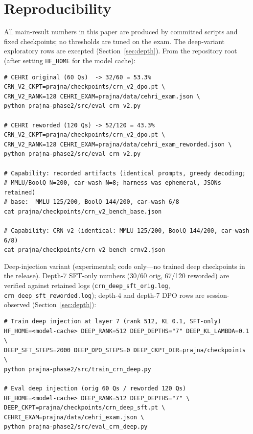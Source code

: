 \documentclass[11pt]{article}
\begin{document}
\section*{Reproducibility}

All main-result numbers in this paper are produced by committed scripts and fixed checkpoints; no thresholds are tuned on the exam.
The deep-variant exploratory rows are excepted (Section~\ref{sec:depth}).
From the repository root (after setting \texttt{HF\_HOME} for the model cache):

\begin{verbatim}
# CEHRI original (60 Qs)  -> 32/60 = 53.3%
CRN_V2_CKPT=prajna/checkpoints/crn_v2_dpo.pt \
CRN_V2_RANK=128 CEHRI_EXAM=prajna/data/cehri_exam.json \
python prajna-phase2/src/eval_crn_v2.py

# CEHRI reworded (120 Qs) -> 52/120 = 43.3%
CRN_V2_CKPT=prajna/checkpoints/crn_v2_dpo.pt \
CRN_V2_RANK=128 CEHRI_EXAM=prajna/data/cehri_exam_reworded.json \
python prajna-phase2/src/eval_crn_v2.py

# Capability: recorded artifacts (identical prompts, greedy decoding;
# MMLU/BoolQ N=200, car-wash N=8; harness was ephemeral, JSONs retained)
# base:  MMLU 125/200, BoolQ 144/200, car-wash 6/8
cat prajna/checkpoints/crn_v2_bench_base.json

# Capability: CRN v2 (identical: MMLU 125/200, BoolQ 144/200, car-wash 6/8)
cat prajna/checkpoints/crn_v2_bench_crnv2.json
\end{verbatim}

Deep-injection variant (experimental; code only---no trained deep checkpoints in the release).
Depth-7 SFT-only numbers (30/60 orig, 67/120 reworded) are verified against retained logs
(\texttt{crn\_deep\_sft\_orig.log}, \texttt{crn\_deep\_sft\_reworded.log}); depth-4 and depth-7 DPO rows are session-observed (Section~\ref{sec:depth}):

\begin{verbatim}
# Train deep injection at layer 7 (rank 512, KL 0.1, SFT-only)
HF_HOME=<model-cache> DEEP_RANK=512 DEEP_DEPTHS="7" DEEP_KL_LAMBDA=0.1 \
DEEP_SFT_STEPS=2000 DEEP_DPO_STEPS=0 DEEP_CKPT_DIR=prajna/checkpoints \
python prajna-phase2/src/train_crn_deep.py

# Eval deep injection (orig 60 Qs / reworded 120 Qs)
HF_HOME=<model-cache> DEEP_RANK=512 DEEP_DEPTHS="7" \
DEEP_CKPT=prajna/checkpoints/crn_deep_sft.pt \
CEHRI_EXAM=prajna/data/cehri_exam.json \
python prajna-phase2/src/eval_crn_deep.py
\end{verbatim}
\end{document}
